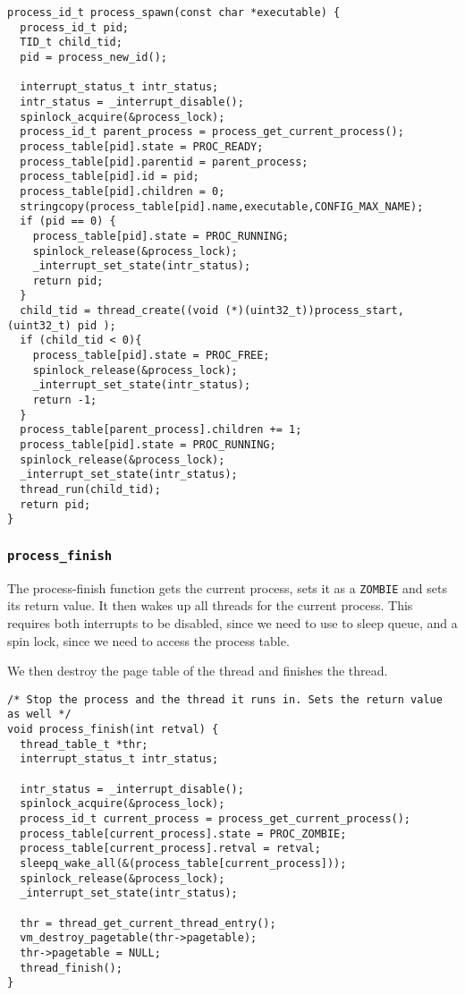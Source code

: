 \documentclass[a4paper,12pt]{article}
\begin{document}
\begin{lstlisting}
process_id_t process_spawn(const char *executable) {
  process_id_t pid;
  TID_t child_tid;
  pid = process_new_id();

  interrupt_status_t intr_status;
  intr_status = _interrupt_disable();
  spinlock_acquire(&process_lock);
  process_id_t parent_process = process_get_current_process();
  process_table[pid].state = PROC_READY;
  process_table[pid].parentid = parent_process;
  process_table[pid].id = pid;
  process_table[pid].children = 0;
  stringcopy(process_table[pid].name,executable,CONFIG_MAX_NAME);
  if (pid == 0) {
    process_table[pid].state = PROC_RUNNING;
    spinlock_release(&process_lock);
    _interrupt_set_state(intr_status);
    return pid;
  }
  child_tid = thread_create((void (*)(uint32_t))process_start,(uint32_t) pid );
  if (child_tid < 0){
    process_table[pid].state = PROC_FREE;
    spinlock_release(&process_lock);
    _interrupt_set_state(intr_status);
    return -1;
  }
  process_table[parent_process].children += 1;
  process_table[pid].state = PROC_RUNNING;
  spinlock_release(&process_lock);
  _interrupt_set_state(intr_status);
  thread_run(child_tid);
  return pid;
}
\end{lstlisting}

\subsubsection{\texttt{process\_finish}}

The process-finish function gets the current process, sets it as a \texttt{ZOMBIE} and sets its return value. It then wakes up all threads for the current process. This requires both interrupts to be disabled, since we need to use to sleep queue, and a spin lock, since we need to access the process table.

We then destroy the page table of the thread and finishes the thread.

\begin{lstlisting}
/* Stop the process and the thread it runs in. Sets the return value as well */
void process_finish(int retval) {
  thread_table_t *thr;
  interrupt_status_t intr_status;
  
  intr_status = _interrupt_disable();
  spinlock_acquire(&process_lock);
  process_id_t current_process = process_get_current_process();
  process_table[current_process].state = PROC_ZOMBIE;
  process_table[current_process].retval = retval;
  sleepq_wake_all(&(process_table[current_process]));
  spinlock_release(&process_lock);
  _interrupt_set_state(intr_status);

  thr = thread_get_current_thread_entry();
  vm_destroy_pagetable(thr->pagetable);
  thr->pagetable = NULL;
  thread_finish();
}
\end{lstlisting}
\end{document}
